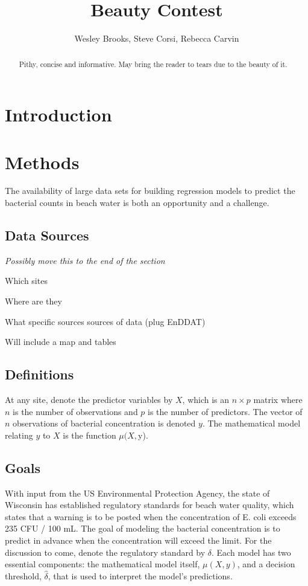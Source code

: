 \documentclass{article}\usepackage[]{graphicx}\usepackage[]{color}
\numberwithin{equation}{section}
\numberwithin{figure}{section}
\renewcommand\[{\begin{equation}}
\renewcommand\]{\end{equation}}
\begin{document}
\title{Beauty Contest}


\author{Wesley Brooks, Steve Corsi, Rebecca Carvin}
\maketitle
\begin{abstract}
Pithy, concise and informative. May bring the reader to tears due
to the beauty of it.
\end{abstract}

\section{Introduction}


\section{Methods}

The availability of large data sets for building regression models
to predict the bacterial counts in beach water is both an opportunity
and a challenge. 


\subsection{Data Sources}

\emph{Possibly move this to the end of the section}

Which sites

Where are they

What specific sources sources of data (plug EnDDAT)

Will include a map and tables


\subsection{Definitions}

At any site, denote the predictor variables by $X$, which is an $n\times p$
matrix where $n$ is the number of observations and $p$ is the number
of predictors. The vector of $n$ observations of bacterial concentration
is denoted $y$. The mathematical model relating $y$ to $X$ is the
function $\mu(X,$y).


\subsection{Goals}

With input from the US Environmental Protection Agency, the state
of Wisconsin has established regulatory standards for beach water
quality, which states that a warning is to be posted when the concentration
of E. coli exceeds 235 CFU / 100 mL.  The goal of modeling the bacterial
concentration is to predict in advance when the concentration will
exceed the limit. For the discussion to come, denote the regulatory
standard by $\delta$. Each model has two essential components: the
mathematical model itself, $\mu(X,y)$, and a decision threshold,
$\hat{{\delta}}$, that is used to interpret the model's predictions.
\end{document}
